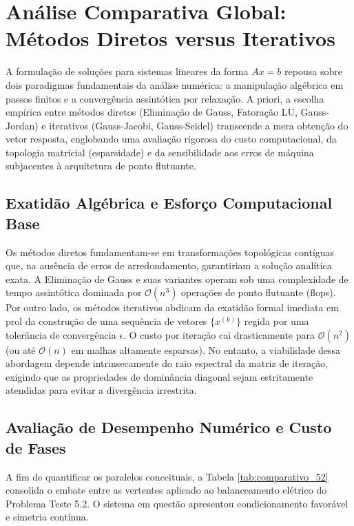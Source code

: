 \section{Análise Comparativa Global: Métodos Diretos versus Iterativos}

A formulação de soluções para sistemas lineares da forma $Ax = b$ repousa sobre dois paradigmas fundamentais da análise numérica: a manipulação algébrica em passos finitos e a convergência assintótica por relaxação. A priori, a escolha empírica entre métodos diretos (Eliminação de Gauss, Fatoração LU, Gauss-Jordan) e iterativos (Gauss-Jacobi, Gauss-Seidel) transcende a mera obtenção do vetor resposta, englobando uma avaliação rigorosa do custo computacional, da topologia matricial (esparsidade) e da sensibilidade aos erros de máquina subjacentes à arquitetura de ponto flutuante.

\subsection{Exatidão Algébrica e Esforço Computacional Base}

Os métodos diretos fundamentam-se em transformações topológicas contíguas que, na ausência de erros de arredondamento, garantiriam a solução analítica exata. A Eliminação de Gauss e suas variantes operam sob uma complexidade de tempo assintótica dominada por $\mathcal{O}(n^3)$ operações de ponto flutuante (flops). Por outro lado, os métodos iterativos abdicam da exatidão formal imediata em prol da construção de uma sequência de vetores $\{x^{(k)}\}$ regida por uma tolerância de convergência $\epsilon$. O custo por iteração cai drasticamente para $\mathcal{O}(n^2)$ (ou até $\mathcal{O}(n)$ em malhas altamente esparsas). No entanto, a viabilidade dessa abordagem depende intrinsecamente do raio espectral da matriz de iteração, exigindo que as propriedades de dominância diagonal sejam estritamente atendidas para evitar a divergência irrestrita.

\subsection{Avaliação de Desempenho Numérico e Custo de Fases}

A fim de quantificar os paralelos conceituais, a Tabela \ref{tab:comparativo_52} consolida o embate entre as vertentes aplicado ao balanceamento elétrico do Problema Teste 5.2. O sistema em questão apresentou condicionamento favorável e simetria contínua.

